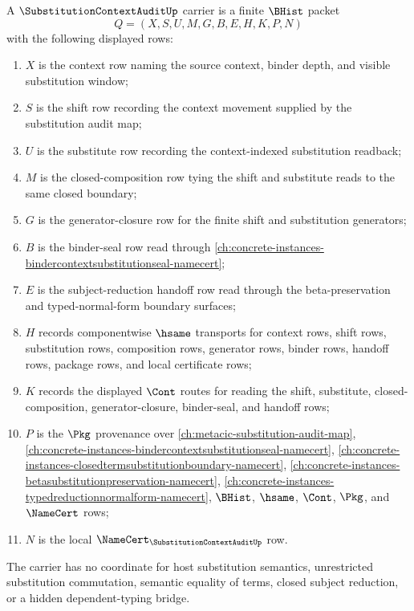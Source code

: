 \begin{definition}
\label{def:substitution-context-audit-carrier}
A $\SubstitutionContextAuditUp$ carrier is a finite $\BHist$ packet
$$
Q=(X,S,U,M,G,B,E,H,K,P,N)
$$
with the following displayed rows:
\begin{enumerate}
\item $X$ is the context row naming the source context, binder depth, and visible substitution window;
\item $S$ is the shift row recording the context movement supplied by the substitution audit map;
\item $U$ is the substitute row recording the context-indexed substitution readback;
\item $M$ is the closed-composition row tying the shift and substitute reads to the same closed boundary;
\item $G$ is the generator-closure row for the finite shift and substitution generators;
\item $B$ is the binder-seal row read through \autoref{ch:concrete-instances-bindercontextsubstitutionseal-namecert};
\item $E$ is the subject-reduction handoff row read through the beta-preservation and typed-normal-form boundary surfaces;
\item $H$ records componentwise $\hsame$ transports for context rows, shift rows, substitution rows, composition rows, generator rows, binder rows, handoff rows, package rows, and local certificate rows;
\item $K$ records the displayed $\Cont$ routes for reading the shift, substitute, closed-composition, generator-closure, binder-seal, and handoff rows;
\item $P$ is the $\Pkg$ provenance over \autoref{ch:metacic-substitution-audit-map}, \autoref{ch:concrete-instances-bindercontextsubstitutionseal-namecert}, \autoref{ch:concrete-instances-closedtermsubstitutionboundary-namecert}, \autoref{ch:concrete-instances-betasubstitutionpreservation-namecert}, \autoref{ch:concrete-instances-typedreductionnormalform-namecert}, $\BHist$, $\hsame$, $\Cont$, $\Pkg$, and $\NameCert$ rows;
\item $N$ is the local $\NameCert_{\SubstitutionContextAuditUp}$ row.
\end{enumerate}
The carrier has no coordinate for host substitution semantics, unrestricted substitution commutation, semantic equality of terms, closed subject reduction, or a hidden dependent-typing bridge.
\end{definition}

